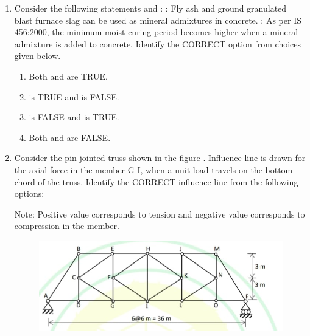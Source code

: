 \documentclass[journal,12pt,onecolumn]{article}
\theoremstyle{remark}
\begin{document}
\begin{enumerate}
    \item Consider the following statements  and :
    : Fly ash and ground granulated blast furnace slag can be used as mineral admixtures in concrete.
    : As per IS 456:2000, the minimum moist curing period becomes higher when a mineral admixture is added to concrete.
    Identify the CORRECT option from choices given below.

    \hfill{}
    \begin{enumerate}
        \item Both  and  are TRUE.
        \item {} is TRUE and  is FALSE.
        \item {} is FALSE and  is TRUE.
        \item Both  and  are FALSE.
    \end{enumerate}

    \item Consider the pin-jointed truss shown in the figure . Influence line is drawn for the axial force in the member G-I, when a unit load travels on the bottom chord of the truss. Identify the CORRECT influence line from the following options:
    
    Note: Positive value corresponds to tension and negative value corresponds to compression in the member.
    \begin{figure}[H]
        \centering
        \includegraphics[width=0.7\columnwidth]{figs/2q-14.jpg}
        \caption{}
        \label{fig:q14}
    \end{figure}


\end{enumerate}
\end{document}

